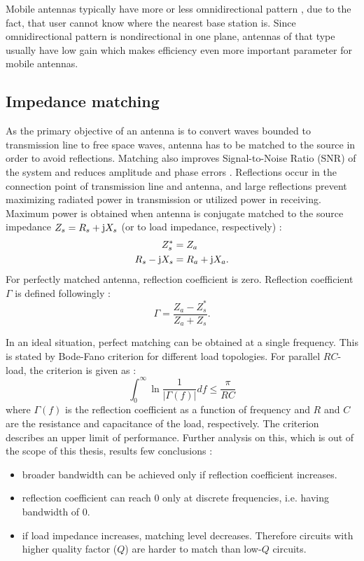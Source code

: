 Mobile antennas typically have more or less omnidirectional pattern \cite{ying_mobile_antennas}, due to the fact, that user cannot know where the nearest base station is. Since omnidirectional pattern is nondirectional in one plane, antennas of that type usually have low gain which makes efficiency even more important parameter for mobile antennas.

\subsection{Impedance matching}
\label{sec:matching}
As the primary objective of an antenna is to convert waves bounded to transmission line to free space waves, antenna has to be matched to the source in order to avoid reflections. Matching also improves Signal-to-Noise Ratio (SNR) of the system and reduces amplitude and phase errors \cite{pozar}. Reflections occur in the connection point of transmission line and antenna, and large reflections prevent maximizing radiated power in transmission or utilized power in receiving. Maximum power is obtained when antenna is conjugate matched to the source impedance $Z_s=R_s+\mathrm{j} X_s$ (or to load impedance, respectively) \cite{stutzman}:
\begin{align}
\label{eq:matching1}
    Z_s^* &= Z_a\\
\label{eq:matching2}
    R_s-\mathrm{j} X_s &= R_a+\mathrm{j} X_a.
\end{align}
For perfectly matched antenna, reflection coefficient is zero. Reflection coefficient $\Gamma$ is defined followingly \cite{stutzman}: 
\begin{equation}
\label{eq:reflection_coeff}
    \Gamma = \frac{Z_a-Z_s^*}{Z_a+Z_s}.
\end{equation}

In an ideal situation, perfect matching can be obtained at a single frequency. This is stated by Bode-Fano criterion for different load topologies. For parallel $RC$-load, the criterion is given as \cite{pozar}:
\begin{equation}
    \int_0^\infty\ln\frac{1}{|\Gamma(f)|}df\leq\frac{\pi}{RC}
\end{equation}
where $\Gamma(f)$ is the reflection coefficient as a function of frequency and $R$ and $C$ are the resistance and capacitance of the load, respectively. The criterion describes an upper limit of performance. Further analysis on this, which is out of the scope of this thesis, results few conclusions \cite{pozar}:
\begin{itemize}
    \item broader bandwidth can be achieved only if reflection coefficient increases.
    \item reflection coefficient can reach 0 only at discrete frequencies, i.e. having bandwidth of 0.
    \item if load impedance increases, matching level decreases. Therefore circuits with higher quality factor ($Q$) are harder to match than low-$Q$ circuits.
\end{itemize}

